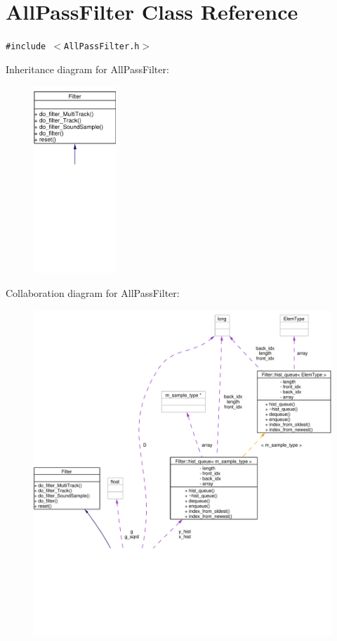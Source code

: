 \hypertarget{classAllPassFilter}{
\section{All\-Pass\-Filter Class Reference}
\label{classAllPassFilter}
}
{\tt \#include $<$All\-Pass\-Filter.h$>$}

Inheritance diagram for All\-Pass\-Filter:\begin{figure}[H]
\begin{center}
\leavevmode
\includegraphics[width=88pt]{classAllPassFilter__inherit__graph}
\end{center}
\end{figure}
Collaboration diagram for All\-Pass\-Filter:\begin{figure}[H]
\begin{center}
\leavevmode
\includegraphics[width=337pt]{classAllPassFilter__coll__graph}
\end{center}
\end{figure}

